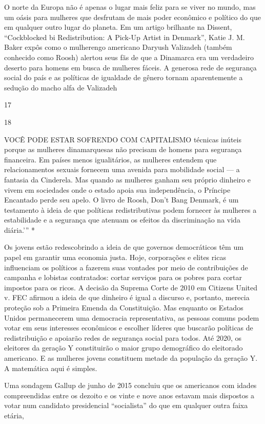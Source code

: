  \par 
O norte da Europa não é apenas o lugar mais feliz para se viver no mundo, mas um oásis para mulheres que desfrutam de mais poder econômico e político do que em qualquer outro lugar do planeta. Em um artigo brilhante na Dissent, “Cockblocked bi Redistribution: A Pick-Up Artist in Denmark”, Katie J. M. Baker expôs como o mulherengo americano Daryush Valizadeh (também conhecido como Roosh) alertou seus fãs de que a Dinamarca era um verdadeiro deserto para homens em busca de mulheres fáceis. A generosa rede de segurança social do país e as políticas de igualdade de gênero tornam aparentemente a sedução do macho alfa de Valizadeh
 \par 
17
 \par 
18
 \par 
VOCÊ PODE ESTAR SOFRENDO COM CAPITALISMO técnicas inúteis porque as mulheres dinamarquesas não precisam de homens para segurança financeira. Em países menos igualitários, as mulheres entendem que relacionamentos sexuais fornecem uma avenida para mobilidade social — a fantasia da Cinderela. Mas quando as mulheres ganham seu próprio dinheiro e vivem em sociedades onde o estado apoia sua independência, o Príncipe Encantado perde seu apelo. O livro de Roosh, Don’t Bang Denmark, é um testamento à ideia de que políticas redistributivas podem fornecer às mulheres a estabilidade e a segurança que atenuam os efeitos da discriminação na vida diária.'” *
 \par 
Os jovens estão redescobrindo a ideia de que governos democráticos têm um papel em garantir uma economia justa. Hoje, corporações e elites ricas influenciam os políticos a fazerem suas vontades por meio de contribuições de campanha e lobistas contratados: cortar serviços para os pobres para cortar impostos para os ricos. A decisão da Suprema Corte de 2010 em Citizens United v. FEC afirmou a ideia de que dinheiro é igual a discurso e, portanto, merecia proteção sob a Primeira Emenda da Constituição. Mas enquanto os Estados Unidos permanecerem uma democracia representativa, as pessoas comuns podem votar em seus interesses econômicos e escolher líderes que buscarão políticas de redistribuição e apoiarão redes de segurança social para todos. Até 2020, os eleitores da geração Y constituirão o maior grupo demográfico do eleitorado americano. E as mulheres jovens constituem metade da população da geração Y. A matemática aqui é simples.
 \par 
Uma sondagem Gallup de junho de 2015 concluiu que os americanos com idades compreendidas entre os dezoito e os vinte e nove anos estavam mais dispostos a votar num candidato presidencial “socialista” do que em qualquer outra faixa etária,
